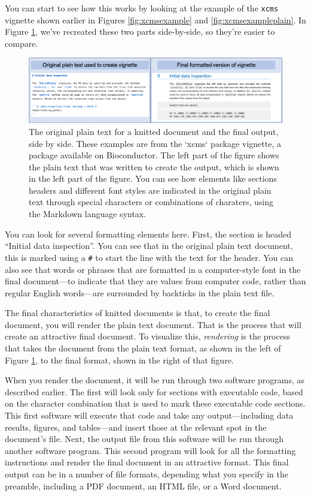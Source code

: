 \documentclass[]{tufte-book}
\begin{document}
You can start to see how this works by looking at the example of the \texttt{xcms}
vignette shown earlier in Figures \ref{fig:xcmsexample} and
\ref{fig:xcmsexampleplain}. In Figure \ref{fig:xcmsbothversions}, we've
recreated these two parts side-by-side, so they're easier to compare.

\begin{figure}
\includegraphics[width=\textwidth]{figures/originalandfinal} \caption[The original plain text for a knitted document and the final output, side by side]{The original plain text for a knitted document and the final output, side by side. These examples are from the `xcms` package vignette, a package available on Bioconductor. The left part of the figure shows the plain text that was written to create the output, which is shown in the left part of the figure. You can see how elements like sections headers and different font styles are indicated in the original plain text through special characters or combinations of charaters, using the Markdown language syntax.}\label{fig:xcmsbothversions}
\end{figure}

You can look for several formatting elements here. First, the section is headed
``Initial data inspection''. You can see that in the original plain text document,
this is marked using a \texttt{\#} to start the line with the text for the header. You
can also see that words or phrases that are formatted in a computer-style font
in the final document---to indicate that they are values from computer code,
rather than regular English words---are surrounded by backticks in the plain
text file.

The final characteristics of knitted documents is that, to create the final
document, you will render the plain text document. That is the process that will
create an attractive final document. To visualize this, \emph{rendering} is the
process that takes the document from the plain text format, as shown in the left
of Figure \ref{fig:xcmsbothversions}, to the final format, shown in the right
of that figure.

When you render the document, it will be run through two software programs, as
described earlier. The first will look only for sections with executable code,
based on the character combination that is used to mark these executable code
sections. This first software will execute that code and take any
output---including data results, figures, and tables---and insert those at the
relevant spot in the document's file. Next, the output file from this software
will be run through another software program. This second program will look
for all the formatting instructions and render the final document in an
attractive format. This final output can be in a number of file formats,
depending what you specify in the preamble, including a PDF document, an HTML
file, or a Word document.
\end{document}
